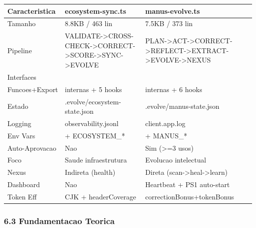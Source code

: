 \documentclass[
  12pt,
]{article}
\newcounter{none} %
\begin{document}
{\def\LTcaptype{none} %
\begin{longtable}[]{@{}
  >{\raggedright\arraybackslash}p{}
  >{\raggedright\arraybackslash}p{}
  >{\raggedright\arraybackslash}p{}@{}}
\toprule\noalign{}
\begin{minipage}[b]{\linewidth}\raggedright
Caracteristica
\end{minipage} & \begin{minipage}[b]{\linewidth}\raggedright
ecosystem-sync.ts
\end{minipage} & \begin{minipage}[b]{\linewidth}\raggedright
manus-evolve.ts
\end{minipage} \\
\midrule\noalign{}
\endhead
\bottomrule\noalign{}
\endlastfoot
Tamanho & 8.8KB / 463 lin & 7.5KB / 373 lin \\
Pipeline &
VALIDATE-\textgreater CROSS-CHECK-\textgreater CORRECT-\textgreater SCORE-\textgreater SYNC-\textgreater EVOLVE
&
PLAN-\textgreater ACT-\textgreater CORRECT-\textgreater REFLECT-\textgreater EXTRACT-\textgreater EVOLVE-\textgreater NEXUS \\
Interfaces & 3 & 6 \\
Funcoes+Export & 6 internas + 5 hooks & 8 internas + 6 hooks \\
Estado & .evolve/ecosystem-state.json & .evolve/manus-state.json \\
Logging & observability.jsonl & client.app.log \\
Env Vars & 25+ ECOSYSTEM\_* & 12+ MANUS\_* \\
Auto-Aprovacao & Nao & Sim (\textgreater=3 usos) \\
Foco & Saude infraestrutura & Evolucao intelectual \\
Nexus & Indireta (health) & Direta
(scan-\textgreater heal-\textgreater learn) \\
Dashboard & Nao & Heartbeat + PS1 auto-start \\
Token Eff & CJK + headerCoverage & correctionBonus+tokenBonus \\
\end{longtable}
}

\subsubsection{6.3 Fundamentacao Teorica}\label{fundamentacao-teorica-5}
\end{document}

